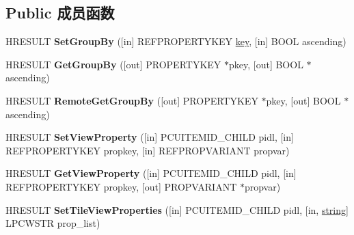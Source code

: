 \subsection*{Public 成员函数}
\begin{DoxyCompactItemize}
\item 
\mbox{\label{interface_i_folder_view2_a9d835a5a66d184f838358d301b6c5be7}} 
H\+R\+E\+S\+U\+LT {\bfseries Set\+Group\+By} (\mbox{[}in\mbox{]} R\+E\+F\+P\+R\+O\+P\+E\+R\+T\+Y\+K\+EY \hyperlink{structkey}{key}, \mbox{[}in\mbox{]} B\+O\+OL ascending)
\item 
\mbox{\label{interface_i_folder_view2_a63a85b66b93fa0eb0bea78b3e90b8ff5}} 
H\+R\+E\+S\+U\+LT {\bfseries Get\+Group\+By} (\mbox{[}out\mbox{]} P\+R\+O\+P\+E\+R\+T\+Y\+K\+EY $\ast$pkey, \mbox{[}out\mbox{]} B\+O\+OL $\ast$ascending)
\item 
\mbox{\label{interface_i_folder_view2_a5631519b45b8a5da371d5b23f1e9a6d4}} 
H\+R\+E\+S\+U\+LT {\bfseries Remote\+Get\+Group\+By} (\mbox{[}out\mbox{]} P\+R\+O\+P\+E\+R\+T\+Y\+K\+EY $\ast$pkey, \mbox{[}out\mbox{]} B\+O\+OL $\ast$ascending)
\item 
\mbox{\label{interface_i_folder_view2_a611f53ce024d37b21eb6055e6d6c8223}} 
H\+R\+E\+S\+U\+LT {\bfseries Set\+View\+Property} (\mbox{[}in\mbox{]} P\+C\+U\+I\+T\+E\+M\+I\+D\+\_\+\+C\+H\+I\+LD pidl, \mbox{[}in\mbox{]} R\+E\+F\+P\+R\+O\+P\+E\+R\+T\+Y\+K\+EY propkey, \mbox{[}in\mbox{]} R\+E\+F\+P\+R\+O\+P\+V\+A\+R\+I\+A\+NT propvar)
\item 
\mbox{\label{interface_i_folder_view2_acae7f2957ccb427419581269eff17ae1}} 
H\+R\+E\+S\+U\+LT {\bfseries Get\+View\+Property} (\mbox{[}in\mbox{]} P\+C\+U\+I\+T\+E\+M\+I\+D\+\_\+\+C\+H\+I\+LD pidl, \mbox{[}in\mbox{]} R\+E\+F\+P\+R\+O\+P\+E\+R\+T\+Y\+K\+EY propkey, \mbox{[}out\mbox{]} P\+R\+O\+P\+V\+A\+R\+I\+A\+NT $\ast$propvar)
\item 
\mbox{\label{interface_i_folder_view2_a9a4615f7db03dec15ae85e940b5fecc8}} 
H\+R\+E\+S\+U\+LT {\bfseries Set\+Tile\+View\+Properties} (\mbox{[}in\mbox{]} P\+C\+U\+I\+T\+E\+M\+I\+D\+\_\+\+C\+H\+I\+LD pidl, \mbox{[}in, \hyperlink{structstring}{string}\mbox{]} L\+P\+C\+W\+S\+TR prop\+\_\+list)

\end{DoxyCompactItemize}
